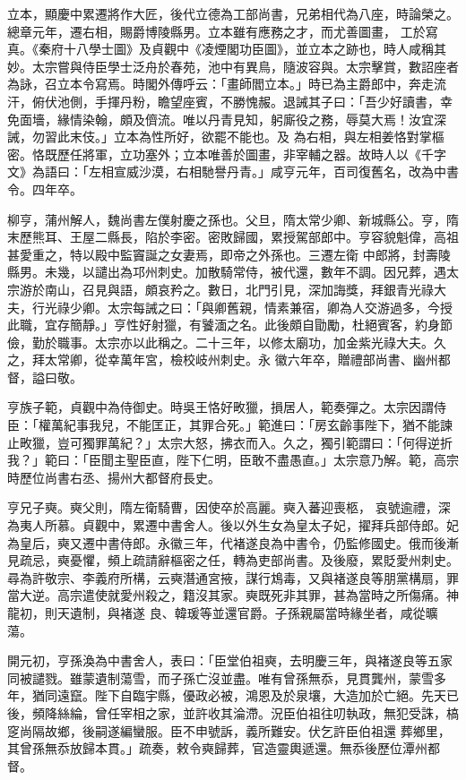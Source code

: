 \begin{pinyinscope}
 立本，顯慶中累遷將作大匠，後代立德為工部尚書，兄弟相代為八座，時論榮之。總章元年，遷右相，賜爵博陵縣男。立本雖有應務之才，而尤善圖畫，
 工於寫真。《秦府十八學士圖》及貞觀中《凌煙閣功臣圖》，並立本之跡也，時人咸稱其妙。太宗嘗與侍臣學士泛舟於春苑，池中有異鳥，隨波容與。太宗擊賞，數詔座者為詠，召立本令寫焉。時閣外傳呼云：「畫師閻立本。」時已為主爵郎中，奔走流汗，俯伏池側，手揮丹粉，瞻望座賓，不勝愧赧。退誡其子曰：「吾少好讀書，幸免面墻，緣情染翰，頗及儕流。唯以丹青見知，躬廝役之務，辱莫大焉！汝宜深誡，勿習此末伎。」立本為性所好，欲罷不能也。及
 為右相，與左相姜恪對掌樞密。恪既歷任將軍，立功塞外；立本唯善於圖畫，非宰輔之器。故時人以《千字文》為語曰：「左相宣威沙漠，右相馳譽丹青。」咸亨元年，百司復舊名，改為中書令。四年卒。



 柳亨，蒲州解人，魏尚書左僕射慶之孫也。父旦，隋太常少卿、新城縣公。亨，隋末歷熊耳、王屋二縣長，陷於李密。密敗歸國，累授駕部郎中。亨容貌魁偉，高祖甚愛重之，特以殿中監竇誕之女妻焉，即帝之外孫也。三遷左衛
 中郎將，封壽陵縣男。未幾，以譴出為邛州刺史。加散騎常侍，被代還，數年不調。因兄葬，遇太宗游於南山，召見與語，頗哀矜之。數日，北門引見，深加誨獎，拜銀青光祿大夫，行光祿少卿。太宗每誡之曰：「與卿舊親，情素兼宿，卿為人交游過多，今授此職，宜存簡靜。」亨性好射獵，有饕湎之名。此後頗自勖勵，杜絕賓客，約身節儉，勤於職事。太宗亦以此稱之。二十三年，以修太廟功，加金紫光祿大夫。久之，拜太常卿，從幸萬年宮，檢校岐州刺史。永
 徽六年卒，贈禮部尚書、幽州都督，謚曰敬。



 亨族子範，貞觀中為侍御史。時吳王恪好畋獵，損居人，範奏彈之。太宗因謂侍臣：「權萬紀事我兒，不能匡正，其罪合死。」範進曰：「房玄齡事陛下，猶不能諫止畋獵，豈可獨罪萬紀？」太宗大怒，拂衣而入。久之，獨引範謂曰：「何得逆折我？」範曰：「臣聞主聖臣直，陛下仁明，臣敢不盡愚直。」太宗意乃解。範，高宗時歷位尚書右丞、揚州大都督府長史。



 亨兄子奭。奭父則，隋左衛騎曹，因使卒於高麗。奭入蕃迎喪柩，
 哀號逾禮，深為夷人所慕。貞觀中，累遷中書舍人。後以外生女為皇太子妃，擢拜兵部侍郎。妃為皇后，奭又遷中書侍郎。永徽三年，代褚遂良為中書令，仍監修國史。俄而後漸見疏忌，奭憂懼，頻上疏請辭樞密之任，轉為吏部尚書。及後廢，累貶愛州刺史。尋為許敬宗、李義府所構，云奭潛通宮掖，謀行鴆毒，又與褚遂良等朋黨構扇，罪當大逆。高宗遣使就愛州殺之，籍沒其家。奭既死非其罪，甚為當時之所傷痛。神龍初，則天遺制，與褚遂
 良、韓瑗等並還官爵。子孫親屬當時緣坐者，咸從曠蕩。



 開元初，亨孫渙為中書舍人，表曰：「臣堂伯祖奭，去明慶三年，與褚遂良等五家同被譴戮。雖蒙遺制蕩雪，而子孫亡沒並盡。唯有曾孫無忝，見貫龔州，蒙雪多年，猶同遠竄。陛下自臨宇縣，優政必被，鴻恩及於泉壤，大造加於亡絕。先天已後，頻降絲綸，曾任宰相之家，並許收其淪滯。況臣伯祖往叨執政，無犯受誅，槁窆尚隔故鄉，後嗣遂編蠻服。臣不申號訴，義所難安。伏乞許臣伯祖還
 葬鄉里，其曾孫無忝放歸本貫。」疏奏，敕令奭歸葬，官造靈輿遞還。無忝後歷位潭州都督。




\end{pinyinscope}
